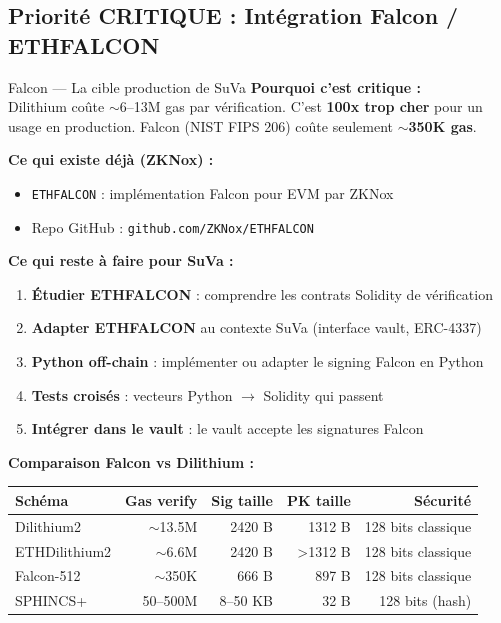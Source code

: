 \documentclass[12pt, a4paper]{article}
\begin{document}
\subsection{Priorité CRITIQUE : Intégration Falcon / ETHFALCON}

\begin{critical}{Falcon --- La cible production de SuVa}
\textbf{Pourquoi c'est critique :}\\
Dilithium coûte $\sim$6--13M gas par vérification. C'est \textbf{100x trop cher} pour un usage en production. Falcon (NIST FIPS 206) coûte seulement $\sim$\textbf{350K gas}.

\textbf{Ce qui existe déjà (ZKNox) :}
\begin{itemize}
  \item \texttt{ETHFALCON} : implémentation Falcon pour EVM par ZKNox
  \item Repo GitHub : \texttt{github.com/ZKNox/ETHFALCON}
\end{itemize}

\textbf{Ce qui reste à faire pour SuVa :}
\begin{enumerate}
  \item \textbf{Étudier ETHFALCON} : comprendre les contrats Solidity de vérification
  \item \textbf{Adapter ETHFALCON} au contexte SuVa (interface vault, ERC-4337)
  \item \textbf{Python off-chain} : implémenter ou adapter le signing Falcon en Python
  \item \textbf{Tests croisés} : vecteurs Python $\to$ Solidity qui passent
  \item \textbf{Intégrer dans le vault} : le vault accepte les signatures Falcon
\end{enumerate}

\textbf{Comparaison Falcon vs Dilithium :}
\begin{center}
\begin{tabular}{lrrrr}
\toprule
\textbf{Schéma} & \textbf{Gas verify} & \textbf{Sig taille} & \textbf{PK taille} & \textbf{Sécurité}\\
\midrule
Dilithium2      & $\sim$13.5M & 2420 B & 1312 B & 128 bits classique \\
ETHDilithium2   & $\sim$6.6M  & 2420 B & >1312 B & 128 bits classique \\
\rowcolor{done_bg}
Falcon-512      & $\sim$350K  &  666 B &  897 B & 128 bits classique \\
SPHINCS+        & 50--500M    & 8--50 KB & 32 B & 128 bits (hash)\\
\bottomrule
\end{tabular}
\end{center}
\end{critical}
\end{document}
